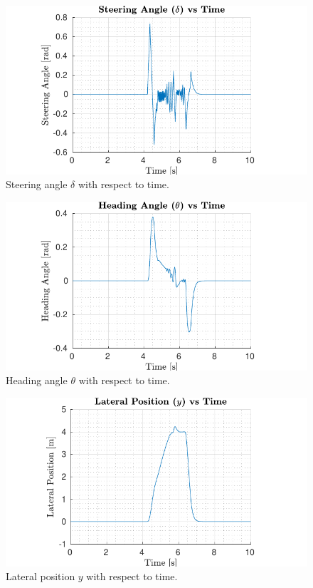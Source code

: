 \documentclass[conference, 11pt]{IEEEtran}
\begin{document}
\begin{figure}[!h]
	\centering
	\includegraphics[width=1\columnwidth]{../../MATLAB/three_obstacles_no_overtaking/figure/SteeringAngleVsTime.pdf}
	\caption{Steering angle $\delta$ with respect to time.}
	\label{fig:delta_braking}
\end{figure}
\begin{figure}[!h]
	\centering
	\includegraphics[width=1\columnwidth]{../../MATLAB/three_obstacles_no_overtaking/figure/HeadingAngleVsTime.pdf}
	\caption{Heading angle $\theta$ with respect to time.}
	\label{fig:theta_braking}
\end{figure}
\begin{figure}[!h]
	\centering
	\includegraphics[width=1\columnwidth]{../../MATLAB/three_obstacles_no_overtaking/figure/LateralPositionVsTime.pdf}
	\caption{Lateral position $y$ with respect to time.}
	\label{fig:lateral_braking}
\end{figure}
\end{document}
